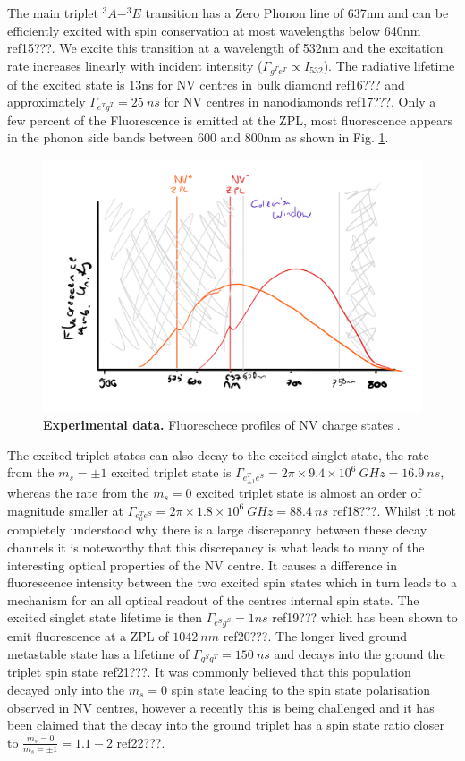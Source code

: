\documentclass[prl]{revtex4}
\begin{document}
The main triplet $^3A-^3E$ transition has a Zero Phonon line of 637nm and can be efficiently excited with spin conservation at most wavelengths below 640nm ref15???. We excite this transition at a wavelength of 532nm and the excitation rate increases linearly with incident intensity ($\Gamma_{g^Te^T} \propto I_{532}$). The radiative lifetime of the excited state is 13ns for NV centres in bulk diamond ref16??? and approximately $\Gamma_{e^Tg^T} = \SI{25}{ns}$ for NV centres in nanodiamonds ref17???. Only a few percent of the Fluorescence is emitted at the ZPL, most fluorescence appears in the phonon side bands between 600 and 800nm as shown in Fig. \ref{FigFluoro}.

\begin{figure}[t]
  \centering
  \includegraphics[width=1\textwidth]{Fluoro.png} 
 \caption{\textbf{Experimental data.} Fluoreschece profiles of NV charge states .} \label{FigFluoro}
\end{figure}

The excited triplet states can also decay to the excited singlet state, the rate from the $m_s=\pm1$ excited triplet state is $\Gamma_{e^T_{\pm1}e^S} = 2\pi\times9.4\times10^6\SI{}{GHz} = \SI{16.9}{ns}$, whereas the rate from the $m_s=0$ excited triplet state is almost an order of magnitude smaller at $\Gamma_{e^T_{0}e^S} = 2\pi\times1.8\times10^6 \SI{}{GHz} = \SI{88.4}{ns}$ ref18???. Whilst it not completely understood why there is a large discrepancy between these decay channels it is noteworthy that this discrepancy is what leads to many of the interesting optical properties of the NV centre. It causes a difference in fluorescence intensity between the two excited spin states which in turn leads to a mechanism for an all optical readout of the centres internal spin state. The excited singlet state lifetime is then $\Gamma_{e^Sg^S} = \si{1}{ns}$ ref19??? which has been shown to emit fluorescence at a ZPL of $\SI{1042}{nm}$ ref20???. The longer lived ground metastable state has a lifetime of $\Gamma_{g^Sg^T} = \SI{150}{ns}$ and decays into the ground the triplet spin state ref21???. It was commonly believed that this population decayed only into the $m_s=0$ spin state leading to the spin state polarisation observed in NV centres, however a recently this is being challenged and it has been claimed that the decay into the ground triplet has a spin state ratio closer to $\frac{m_s=0}{m_s=\pm1} = 1.1-2$ ref22???. 
\end{document}
